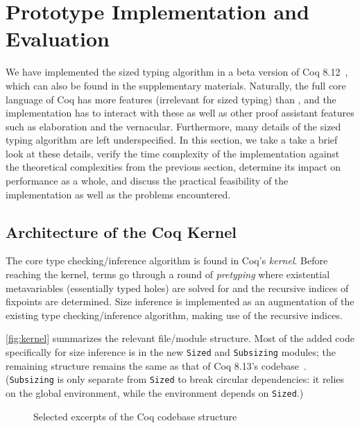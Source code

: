 \section{Prototype Implementation and Evaluation} \label{sec:impl}

We have implemented the sized typing algorithm in a beta version of Coq 8.12~\citep{impl},
which can also be found in the supplementary materials.
Naturally, the full core language of Coq has more features (irrelevant for sized typing) than \lang,
and the implementation has to interact with these as well as other proof assistant features such as elaboration and the vernacular.
Furthermore, many details of the sized typing algorithm are left underspecified.
In this section, we take a take a brief look at these details,
verify the time complexity of the implementation against the theoretical complexities from the previous section,
determine its impact on performance as a whole,
and discuss the practical feasibility of the implementation as well as the problems encountered.

\subsection{Architecture of the Coq Kernel}

The core type checking/inference algorithm is found in Coq's \emph{kernel}.
Before reaching the kernel, terms go through a round of \emph{pretyping}
where existential metavariables (essentially typed holes) are solved for
and the recursive indices of fixpoints are determined.
Size inference is implemented as an augmentation of the existing type checking/inference algorithm,
making use of the recursive indices.

\autoref{fig:kernel} summarizes the relevant file/module structure.
Most of the added code specifically for size inference is in the new \texttt{Sized} and \texttt{Subsizing} modules;
the remaining structure remains the same as that of Coq 8.13's codebase~\citep{coq}.
(\texttt{Subsizing} is only separate from \texttt{Sized} to break circular dependencies: it relies on the global environment, while the environment depends on \texttt{Sized}.)

\begin{figure}
\caption{Selected excerpts of the Coq codebase structure}
\label{fig:kernel}
\end{figure}

